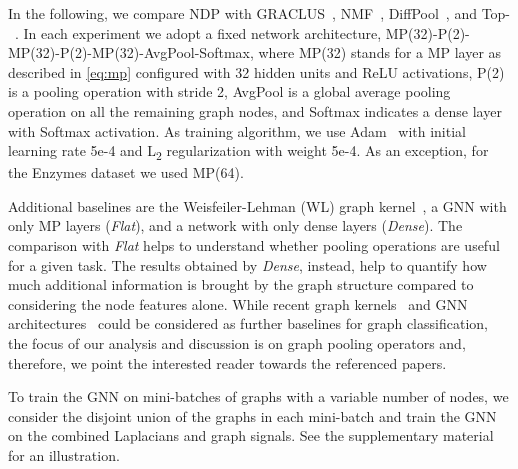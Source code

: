 \documentclass[journal]{IEEEtran}
\begin{document}
In the following, we compare NDP with GRACLUS~\cite{defferrard2016convolutional}, NMF~\cite{bacciu2019non}, DiffPool~\cite{ying2018hierarchical}, and Top-~\cite{graphunet}.
In each experiment we adopt a fixed network architecture, MP(32)-P(2)-MP(32)-P(2)-MP(32)-AvgPool-Softmax, where MP(32) stands for a MP layer as described in \eqref{eq:mp} configured with 32 hidden units and ReLU activations, P(2) is a pooling operation with stride 2, AvgPool is a global average pooling operation on all the remaining graph nodes, and Softmax indicates a dense layer with Softmax activation.
As training algorithm, we use Adam~\cite{kingma2014adam} with initial learning rate 5e-4 and L\textsubscript{2} regularization with weight 5e-4.
As an exception, for the Enzymes dataset we used MP(64). 

Additional baselines are the Weisfeiler-Lehman (WL) graph kernel~\cite{shervashidze2011weisfeiler}, a GNN with only MP layers (\textit{Flat}), and a network with only dense layers (\textit{Dense}).
The comparison with \textit{Flat} helps to understand whether pooling operations are useful for a given task.
The results obtained by \textit{Dense}, instead, help to quantify how much additional information is brought by the graph structure compared to considering the node features alone.
While recent graph kernels~\cite{yanardag2015deep, martino2019hyper, togninalli2019wasserstein} and GNN architectures~\cite{bai2020learning, jiang2019walk} could be considered as further baselines for graph classification, the focus of our analysis and discussion is on graph pooling operators and, therefore, we point the interested reader towards the referenced papers. 

To train the GNN on mini-batches of graphs with a variable number of nodes, we consider the disjoint union of the graphs in each mini-batch and train the GNN on the combined Laplacians and graph signals.
See the supplementary material for an illustration.
\end{document}
